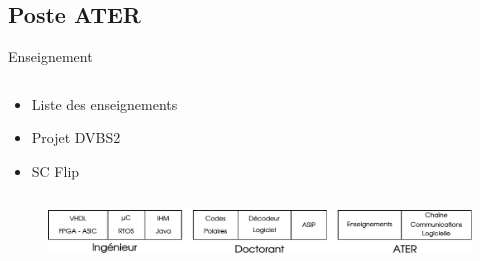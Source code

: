 \documentclass[t,compress,mathserif,12pt,xcolor=dvipsnames]{beamer}
\begin{document}
\subsection{Poste ATER}
\begin{frame}[t]{Enseignement}
  \begin{minipage}[t][5.0cm][t]{\textwidth}
    \begin{columns}
      \begin{column}{0.63\textwidth}
        \vspace{-30pt}
          \begin{itemize}
            \item Liste des enseignements
            \item Projet DVBS2
            \item SC Flip
          \end{itemize}
      \end{column}
      \begin{column}{0.04\textwidth}

      \end{column}
      \begin{column}{0.33\textwidth}
      \end{column}
    \end{columns}
  \end{minipage}
  \begin{figure}[htp]
    \centering
    \includegraphics[width=\textwidth]{fig/frise}
  \end{figure}


\end{frame} 
\end{document}
